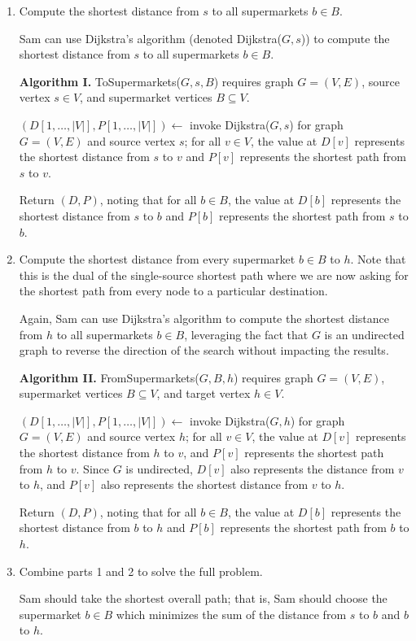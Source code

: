 \begin{enumerate}
\item Compute the shortest distance from $s$ to all supermarkets $b \in B$.
\begin{solution}
Sam can use Dijkstra's algorithm (denoted {\sc Dijkstra}($G,s$)) to compute the shortest distance from $s$ to all supermarkets $b\in B$.

\textbf{Algorithm I. }{\sc ToSupermarkets}($G,s,B$) requires graph $G=(V,E)$, source vertex $s\in V$, and supermarket vertices $B\subseteq V$.

$(D[1,\dots,|V|],P[1,\dots,|V|])\leftarrow$ invoke {\sc Dijkstra}($G,s$) for graph $G=(V,E)$ and source vertex $s$; for all $v\in V$, the value at $D[v]$ represents the shortest distance from $s$ to $v$ and $P[v]$ represents the shortest path from $s$ to $v$.

Return $(D,P)$, noting that for all $b\in B$, the value at $D[b]$ represents the shortest distance from $s$ to $b$ and $P[b]$ represents the shortest path from $s$ to $b$.
\end{solution}
\item Compute the shortest distance from every supermarket $b \in B$ to $h$. Note that this is the dual of the single-source shortest path where we are now asking for the shortest path from every node to a particular destination.
\begin{solution}
Again, Sam can use Dijkstra's algorithm to compute the shortest distance from $h$ to all supermarkets $b\in B$, leveraging the fact that $G$ is an undirected graph to reverse the direction of the search without impacting the results.

\textbf{Algorithm II. }{\sc FromSupermarkets}($G,B,h$) requires graph $G=(V,E)$, supermarket vertices $B\subseteq V$, and target vertex $h\in V$.

$(D[1,\dots,|V|],P[1,\dots,|V|])\leftarrow $ invoke {\sc Dijkstra}($G,h$) for graph $G=(V,E)$ and source vertex $h$; for all $v\in V$, the value at $D[v]$ represents the shortest distance from $h$ to $v$, and $P[v]$ represents the shortest path from $h$ to $v$. Since $G$ is undirected, $D[v]$ also represents the distance from $v$ to $h$, and $P[v]$ also represents the shortest distance from $v$ to $h$.

Return $(D,P)$, noting that for all $b\in B$, the value at $D[b]$ represents the shortest distance from $b$ to $h$ and $P[b]$ represents the shortest path from $b$ to $h$.
\end{solution}
\newpage
\item Combine parts 1 and 2 to solve the full problem.
\begin{solution}
Sam should take the shortest overall path; that is, Sam should choose the supermarket $b\in B$ which minimizes the sum of the distance from $s$ to $b$ and $b$ to $h$.


\end{solution}
\end{enumerate}
